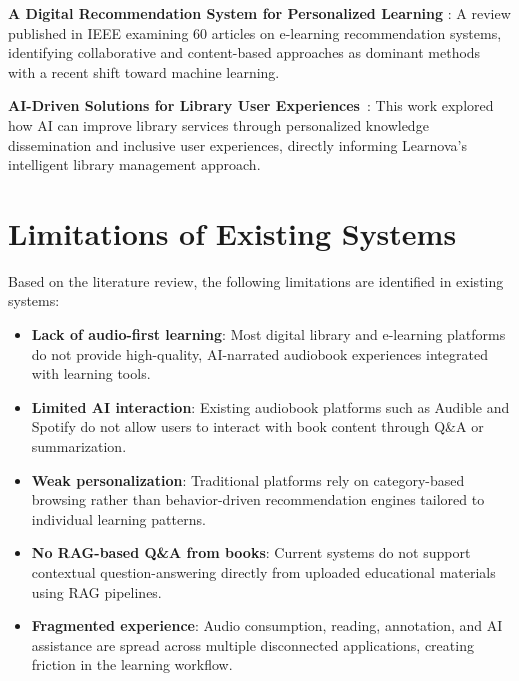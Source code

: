 \textbf{A Digital Recommendation System for Personalized Learning}
\cite{ieeerecsys2024}: A review published in IEEE examining 60 articles on
e-learning recommendation systems, identifying collaborative and content-based
approaches as dominant methods with a recent shift toward machine learning.

\textbf{AI-Driven Solutions for Library User Experiences}~\cite{ikwuanusi2023}:
This work explored how AI can improve library services through personalized
knowledge dissemination and inclusive user experiences, directly informing
Learnova's intelligent library management approach.

\section{Limitations of Existing Systems}
\label{sec:limitations}

Based on the literature review, the following limitations are identified in
existing systems:

\begin{itemize}
  \item \textbf{Lack of audio-first learning}: Most digital library and
        e-learning platforms do not provide high-quality, AI-narrated audiobook
        experiences integrated with learning tools.

  \item \textbf{Limited AI interaction}: Existing audiobook platforms such as
        Audible and Spotify do not allow users to interact with book content
        through Q\&A or summarization.

  \item \textbf{Weak personalization}: Traditional platforms rely on
        category-based browsing rather than behavior-driven recommendation
        engines tailored to individual learning patterns.

  \item \textbf{No RAG-based Q\&A from books}: Current systems do not support
        contextual question-answering directly from uploaded educational
        materials using RAG pipelines.

  \item \textbf{Fragmented experience}: Audio consumption, reading, annotation,
        and AI assistance are spread across multiple disconnected applications,
        creating friction in the learning workflow.
\end{itemize}

